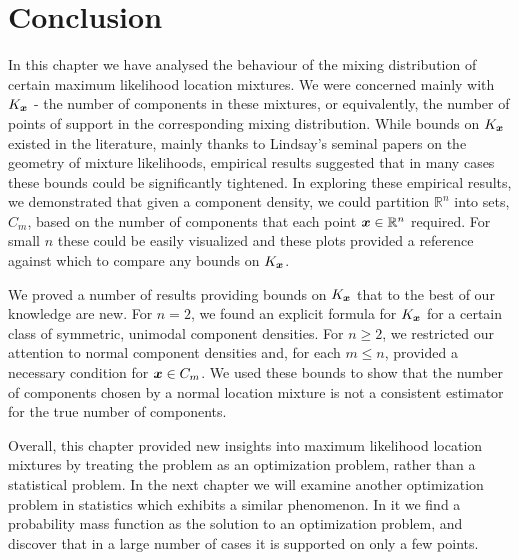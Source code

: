 
\section{Conclusion}

In this chapter we have analysed the behaviour of the mixing distribution of certain maximum likelihood location mixtures. We were concerned mainly with $K_{\bm{{x}}}$ - the number of components in these mixtures, or equivalently, the number of points of support in the corresponding mixing distribution. While bounds on $K_{\bm{{x}}}$ existed in the literature, mainly thanks to Lindsay's seminal papers on the geometry of mixture likelihoods, empirical results suggested that in many cases these bounds could be significantly tightened. In exploring these empirical results, we demonstrated that given a component density, we could partition $\mathbb{R}^n$ into sets, $C_m$, based on the number of components that each point ${\bm{{x}}} \in \mathbb{R}^n$ required. For small $n$ these could be easily visualized and these plots provided a reference against which to compare any bounds on $K_{\bm{{x}}}$.

We proved a number of results providing bounds on $K_{\bm{{x}}}$ that to the best of our knowledge are new. For $n = 2$, we found an explicit formula for $K_{\bm{{x}}}$ for a certain class of symmetric, unimodal component densities. For $n \geq 2$, we restricted our attention to normal component densities and, for each $m \leq n$, provided a necessary condition for ${\bm{{x}}} \in C_m$. We used these bounds to show that the number of components chosen by a normal location mixture is not a consistent estimator for the true number of components. 

Overall, this chapter provided new insights into maximum likelihood location mixtures by treating the problem as an optimization problem, rather than a statistical problem.
In the next chapter we will examine another optimization problem in statistics which exhibits a similar phenomenon. In it we find a probability mass function as the solution to an optimization problem, and discover that in a large number of cases it is supported on only a few points.